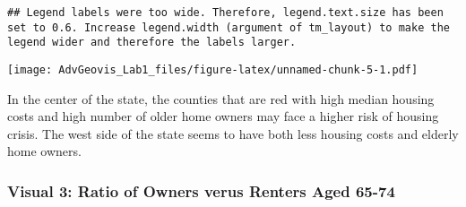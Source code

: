 \documentclass[
]{article}
\begin{document}
\begin{verbatim}
## Legend labels were too wide. Therefore, legend.text.size has been set to 0.6. Increase legend.width (argument of tm_layout) to make the legend wider and therefore the labels larger.
\end{verbatim}

\texttt{[image: AdvGeovis\_Lab1\_files/figure-latex/unnamed-chunk-5-1.pdf]}

In the center of the state, the counties that are red with high median
housing costs and high number of older home owners may face a higher
risk of housing crisis. The west side of the state seems to have both
less housing costs and elderly home owners.

\subsubsection{Visual 3: Ratio of Owners verus Renters Aged
65-74}\label{visual-3-ratio-of-owners-verus-renters-aged-65-74}
\end{document}
